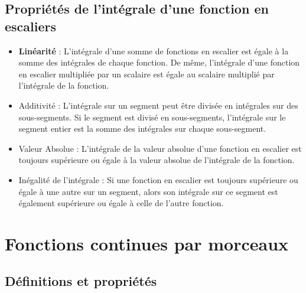 \subsection{Propriétés de l'intégrale d'une fonction en escaliers} %
\label{sub:Propriétés de l'intégrale d'une fonction en escaliers}
\begin{itemize}

    \item \textbf{Linéarité} : L'intégrale d'une somme de fonctions en escalier est égale à la somme des intégrales de chaque fonction. De même, l'intégrale d'une fonction en escalier multipliée par un scalaire est égale au scalaire multiplié par l'intégrale de la fonction.

    \item Additivité : L'intégrale sur un segment peut être divisée en intégrales sur des sous-segments. Si le segment est divisé en sous-segments, l'intégrale sur le segment entier est la somme des intégrales sur chaque sous-segment.

    \item Valeur Absolue : L'intégrale de la valeur absolue d'une fonction en escalier est toujours supérieure ou égale à la valeur absolue de l'intégrale de la fonction.

    \item Inégalité de l'intégrale : Si une fonction en escalier est toujours supérieure ou égale à une autre sur un segment, alors son intégrale sur ce segment est également supérieure ou égale à celle de l'autre fonction.


\end{itemize}

\section{Fonctions continues par morceaux} %
\label{sec:Fonctions continues par morceaux}

\subsection{Définitions et propriétés} %
\label{sub:Définitions et propriétés}

